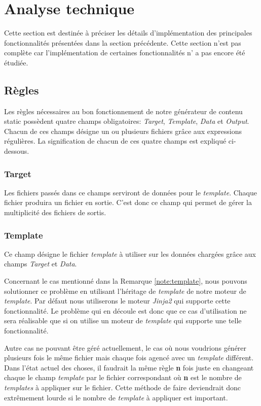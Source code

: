 \section{Analyse technique}
	Cette section est destinée à préciser les détails d'implémentation des principales fonctionnalités présentées dans la section précédente. Cette section n'est pas complète car l'implémentation de certaines fonctionnalités n' a pas encore été étudiée.
	
	\subsection{Règles}
		Les règles nécessaires au bon fonctionnement de notre générateur de contenu static possèdent quatre champs obligatoires: \textit{Target}, \textit{Template}, \textit{Data} et \textit{Output}. Chacun de ces champs désigne un ou plusieurs fichiers grâce aux expressions régulières. La signification de chacun de ces quatre champs est expliqué ci-dessous. 
		
		\subsubsection*{Target}
			Les fichiers passés dans ce champs serviront de données pour le \textit{template}. Chaque fichier produira un fichier en sortie. C'est donc ce champ qui permet de gérer la multiplicité des fichiers de sortis.
		
		\subsubsection*{Template}
			Ce champ désigne le fichier \textit{template} à utiliser sur les données chargées grâce aux champs \textit{Target} et \textit{Data}. 
			
			Concernant le cas mentionné dans la Remarque \ref{note:template}, nous pouvons solutionner ce problème en utilisant l'héritage de \textit{template} de notre moteur de \textit{template}. Par défaut nous utiliserons le moteur \textit{Jinja2} \cite{Jinja2} qui supporte cette fonctionnalité. Le problème qui en découle est donc que ce cas d'utilisation ne sera réalisable que si on utilise un moteur de \textit{template} qui supporte une telle fonctionnalité.
			
			Autre cas ne pouvant être géré actuellement, le cas où nous voudrions générer plusieurs fois le même fichier mais chaque fois agencé avec un \textit{template} différent. Dans l'état actuel des choses, il faudrait la même règle \textbf{n} fois juste en changeant chaque le champ \textit{template} par le fichier correspondant où \textbf{n} est le nombre de \textit{templates} à appliquer sur le fichier. Cette méthode de faire deviendrait donc extrêmement lourde si le nombre de \textit{template} à appliquer est important.
		
